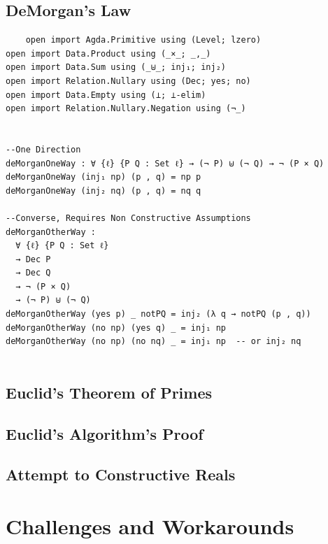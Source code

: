 \documentclass[12pt]{article}
\begin{document}
\subsection{DeMorgan's Law}
\begin{verbatim}
    open import Agda.Primitive using (Level; lzero)
open import Data.Product using (_×_; _,_)
open import Data.Sum using (_⊎_; inj₁; inj₂)
open import Relation.Nullary using (Dec; yes; no)
open import Data.Empty using (⊥; ⊥-elim)
open import Relation.Nullary.Negation using (¬_)


--One Direction
deMorganOneWay : ∀ {ℓ} {P Q : Set ℓ} → (¬ P) ⊎ (¬ Q) → ¬ (P × Q)
deMorganOneWay (inj₁ np) (p , q) = np p
deMorganOneWay (inj₂ nq) (p , q) = nq q

--Converse, Requires Non Constructive Assumptions
deMorganOtherWay :
  ∀ {ℓ} {P Q : Set ℓ}
  → Dec P
  → Dec Q
  → ¬ (P × Q)
  → (¬ P) ⊎ (¬ Q)
deMorganOtherWay (yes p) _ notPQ = inj₂ (λ q → notPQ (p , q))
deMorganOtherWay (no np) (yes q) _ = inj₁ np
deMorganOtherWay (no np) (no nq) _ = inj₁ np  -- or inj₂ nq


\end{verbatim}
\subsection{Euclid's Theorem of Primes }



\subsection{Euclid's Algorithm's Proof}

\subsection{Attempt to Constructive Reals}






 

\section{Challenges and Workarounds}





 

\end{document}

